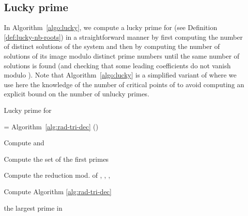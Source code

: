 \documentclass{sig-alternate}
\newcommand{\blue}[1]{\color{blue}#1\color{black}\xspace}
\renewcommand{\blue}[1]{#1\xspace}
\begin{document}
\subsection{Lucky prime}

In Algorithm~\ref{algo:lucky}, we compute a lucky prime for  (see Definition
\ref{def:lucky-nb-roots}) in a straightforward manner by first computing the number of distinct
solutions of the system and then by computing the number of solutions
of its image modulo distinct prime numbers  until the same number of solutions is found (and
checking that some leading coefficients do not vanish modulo ). Note that
Algorithm~\ref{algo:lucky} is a simplified variant of \blue{\cite[Algorithm 3]{bouzidiJSC2014a}} where we use here   the knowledge of the number of critical points of 
to avoid  computing an explicit bound on
the number of unlucky primes. 


\begin{algorithm}[t]
  \caption{Lucky prime for  } 
\label{algo:lucky}
\begin{algorithmic}[1]



\STATE = Algorithm~\ref{alg:rad-tri-dec} () \label{line-distinct}

\STATE Compute  and 
\label{alg:nbrootZ1}

\STATE 

 \label{alg:nbrootZ3}

\STATE Compute the set  of the first  primes  


\STATE Compute the reduction mod.  of , , ,  \label{alg:nbrootZ6.1}

\IF{   \label{alg:nbrootZ4}} 
 \STATE Compute   Algorithm \ref{alg:rad-tri-dec}\label{alg:nbrootZ5}
 \IF {\label{alg:nbrootZ6}} 
 \RETURN 
 \ENDIF
   \ENDIF
\ENDFOR
 
\STATE  the largest prime in   

\ENDWHILE 

\end{algorithmic}
\end{algorithm}
\end{document}
